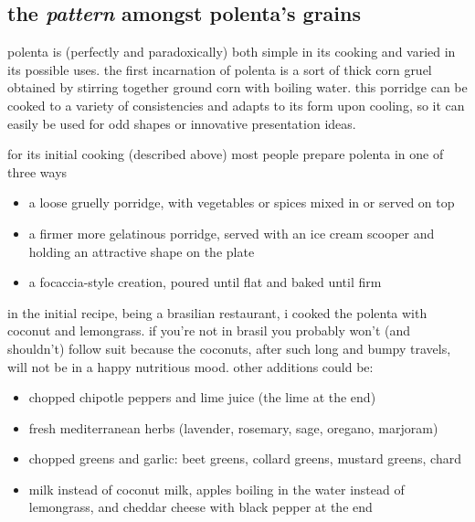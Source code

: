 \subsection{the \textit{pattern} amongst polenta's grains}

polenta is (perfectly and paradoxically) both simple in its cooking and varied 
in its possible uses. the first incarnation of polenta is a sort of thick corn 
gruel obtained by stirring together ground corn with boiling water. this 
porridge can be cooked to a variety of consistencies and adapts to its form 
upon cooling, so it can easily be used for odd shapes or innovative 
presentation ideas.

for its initial cooking (described above) most people prepare polenta in one 
of three ways

\begin{itemize}

  \item a loose gruelly porridge, with vegetables or spices mixed in or 
  served on top
  
  \item a firmer more gelatinous porridge, served with an ice cream scooper 
  and holding an attractive shape on the plate
  
  \item a focaccia-style creation, poured until flat and baked until firm

\end{itemize}

in the initial recipe, being a brasilian restaurant, i cooked the polenta 
with coconut and lemongrass. if you're not in brasil you probably won't 
(and shouldn't) follow suit because the coconuts, after such long and bumpy 
travels, will not be in a happy nutritious mood. other additions could be:

\begin{itemize}

  \item chopped chipotle peppers and lime juice (the lime at the end)

  \item fresh mediterranean herbs (lavender, rosemary, sage, oregano, marjoram)

  \item chopped greens and garlic: beet greens, collard greens, mustard 
  greens, chard

  \item milk instead of coconut milk, apples boiling in the water instead of 
  lemongrass, and cheddar cheese with black pepper at the end

\end{itemize}

